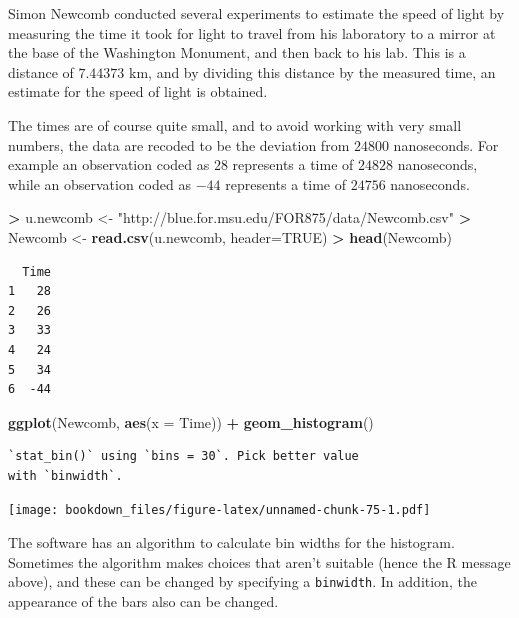 \documentclass[]{krantz}
\makeatletter
\newenvironment{Shaded}{\begin{snugshade}}{\end{snugshade}}
\newcommand{\KeywordTok}[1]{\textcolor[rgb]{0.27,0.27,0.27}{\textbf{#1}}}
\newcommand{\DataTypeTok}[1]{\textcolor[rgb]{0.27,0.27,0.27}{#1}}
\newcommand{\StringTok}[1]{\textcolor[rgb]{0.5,0.5,0.5}{#1}}
\newcommand{\OtherTok}[1]{\textcolor[rgb]{0.37,0.37,0.37}{#1}}
\newcommand{\OperatorTok}[1]{\textcolor[rgb]{0.43,0.43,0.43}{\textbf{#1}}}
\newcommand{\NormalTok}[1]{#1}
\newenvironment{kframe}{%
\medskip{}
\setlength{\fboxsep}{.8em}
 \def\at@end@of@kframe{}%
 \ifinner\ifhmode%
  \def\at@end@of@kframe{\end{minipage}}%
  \begin{minipage}{\columnwidth}%
 \fi\fi%
 \def\FrameCommand##1{\hskip\@totalleftmargin \hskip-\fboxsep
 \colorbox{shadecolor}{##1}\hskip-\fboxsep
     \hskip-\linewidth \hskip-\@totalleftmargin \hskip\columnwidth}%
 \MakeFramed {\advance\hsize-\width
   \@totalleftmargin\z@ \linewidth\hsize
   \@setminipage}}%
 {\par\unskip\endMakeFramed%
 \at@end@of@kframe}
\renewenvironment{Shaded}{\begin{kframe}}{\end{kframe}}
\makeatother
\begin{document}
Simon Newcomb conducted several experiments to estimate the speed of
light by measuring the time it took for light to travel from his
laboratory to a mirror at the base of the Washington Monument, and then
back to his lab. This is a distance of \(7.44373\) km, and by dividing
this distance by the measured time, an estimate for the speed of light
is obtained.

The times are of course quite small, and to avoid working with very
small numbers, the data are recoded to be the deviation from \(24800\)
nanoseconds. For example an observation coded as \(28\) represents a
time of \(24828\) nanoseconds, while an observation coded as \(-44\)
represents a time of \(24756\) nanoseconds.

\begin{Shaded}
\begin{Highlighting}[]
\OperatorTok{>}\StringTok{ }\NormalTok{u.newcomb <-}\StringTok{ "http://blue.for.msu.edu/FOR875/data/Newcomb.csv"}
\OperatorTok{>}\StringTok{ }\NormalTok{Newcomb <-}\StringTok{ }\KeywordTok{read.csv}\NormalTok{(u.newcomb, }\DataTypeTok{header=}\OtherTok{TRUE}\NormalTok{)}
\OperatorTok{>}\StringTok{ }\KeywordTok{head}\NormalTok{(Newcomb)}
\end{Highlighting}
\end{Shaded}

\begin{verbatim}
  Time
1   28
2   26
3   33
4   24
5   34
6  -44
\end{verbatim}

\begin{Shaded}
\begin{Highlighting}[]
\KeywordTok{ggplot}\NormalTok{(Newcomb, }\KeywordTok{aes}\NormalTok{(}\DataTypeTok{x =}\NormalTok{ Time)) }\OperatorTok{+}\StringTok{ }\KeywordTok{geom_histogram}\NormalTok{()}
\end{Highlighting}
\end{Shaded}

\begin{verbatim}
`stat_bin()` using `bins = 30`. Pick better value
with `binwidth`.
\end{verbatim}

\texttt{[image: bookdown\_files/figure-latex/unnamed-chunk-75-1.pdf]}

The software has an algorithm to calculate bin widths for the histogram.
Sometimes the algorithm makes choices that aren't suitable (hence the R
message above), and these can be changed by specifying a
\texttt{binwidth}. In addition, the appearance of the bars also can be
changed.
\end{document}
